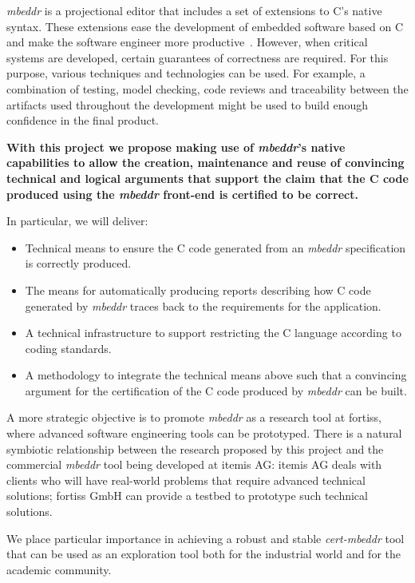 \emph{mbeddr} is a projectional editor that includes a set of extensions to C's
native syntax. These extensions ease the development of embedded software based
on C and make the software engineer more
productive~\cite{VoelterRKS13}.
However, when critical systems are developed, certain guarantees of correctness
are required. For this purpose, various techniques and technologies
can be used. For example, a combination of testing, model checking, code
reviews and traceability between the artifacts used throughout the development
might be used to build enough confidence in the final product.

\vspace{2mm}
\noindent
\textbf{With this project we propose making use of \emph{mbeddr}'s native capabilities
to allow the creation, maintenance and reuse of convincing technical and logical
arguments that support the claim that the C code produced using the
\emph{mbeddr} front-end is certified to be correct.} 
\vspace{2mm}
\noindent

In particular, we will deliver:
\begin{itemize}
  \item Technical means to ensure the C code generated from an \emph{mbeddr}
  specification is correctly produced.
  \item The means for automatically producing reports describing how
   C code generated by \emph{mbeddr} traces back to the requirements for the
   application.
\item A technical infrastructure to support restricting the C language according
to coding standards.
\item A methodology to integrate the technical means above such that a
convincing argument for the certification of the C code produced by \emph{mbeddr} can be built.
\end{itemize}

A more strategic objective is to promote \emph{mbeddr} as a research tool
at fortiss, where advanced software engineering tools can be prototyped. There
is a natural symbiotic relationship between the research proposed by this project and
the commercial \emph{mbeddr} tool being developed at itemis AG:
itemis AG deals with clients who will have real-world problems that require
advanced technical solutions; fortiss GmbH can provide a testbed to prototype
such technical solutions.
% 

We place particular importance in achieving a robust and stable
\emph{cert-mbeddr} tool that can be used as an exploration tool both for
the industrial world and for the academic community.